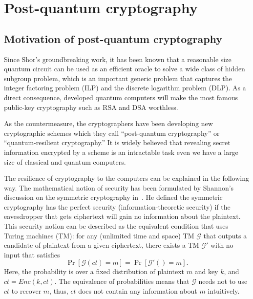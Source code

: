 

	







\clearpage 

\section{Post-quantum cryptography}

\subsection{Motivation of post-quantum cryptography}

Since Shor's groundbreaking work, 
it has been known that a reasonable size quantum circuit can be used as 
an efficient oracle to solve a wide class of hidden subgroup problem,
which is an important generic problem that captures 
the integer factoring problem (ILP)  and the discrete logarithm problem (DLP). 
As a direct consequence, developed quantum computers will make 
the most famous public-key cryptography such as RSA and DSA worthless. 

As the countermeasure, the cryptographers have been developing 
new cryptographic schemes which they call ``post-quantum cryptography''
or ``quantum-resilient cryptography.'' 
It is widely believed that revealing secret information encrypted by a scheme is an intractable task even we have a large size of classical and quantum computers.


The resilience of cryptography to the computers can be explained in the following way.
The mathematical notion of security has been formulated by Shannon's discussion on the symmetric cryptography in~\cite{Sha49}.
He defined the symmetric cryptography has the perfect security (information-theoretic security) if the eavesdropper that gets ciphertext will gain no information about the plaintext.
This security notion can be described as the equivalent condition that 
uses Turing machines (TM):
for any (unlimited time and space) TM $\mathcal{G}$ that outputs a candidate of plaintext from a given ciphertext, there exists a TM $\mathcal{G}'$ with no input that satisfies
%
\begin{equation}
	\label{eqn:ITalg}
	\Pr[ \mathcal{G}(ct) = m ] = \Pr [\mathcal{G}'() = m ].
\end{equation}
%
Here, the probability is over a fixed distribution of plaintext $m$ and key $k$, and $ct = Enc(k,ct)$.
The equivalence of probabilities means that $\mathcal{G}$ needs not to use $ct$ to recover $m$, thus, $ct$ does not contain any information about $m$ intuitively.

